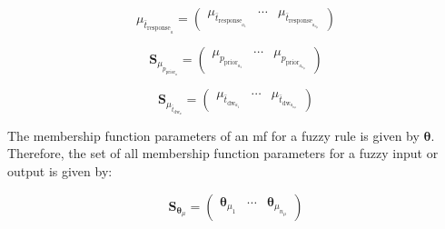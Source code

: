 \documentclass[conference]{IEEEtran}
\begin{document}
\begin{equation} \label{eq:S_mu_t_response}
    {\mu_{\bar{t}_{\text{response}_{a}}}} = 
    \begin{pmatrix}
        \mu_{\bar{t}_{\text{response}_{a_{1}}}} & \cdots & \mu_{\bar{t}_{\text{response}_{a_{n_{\mu}}}}}
    \end{pmatrix}
\end{equation}

\begin{equation} \label{eq:S_mu_p_prior}
    \bm{S}_{\mu_{p_{\text{prior}_{a}}}} = 
    \begin{pmatrix}
        \mu_{p_{\text{prior}_{a_{1}}}} & \cdots & \mu_{p_{\text{prior}_{a_{n_{\mu}}}}}
    \end{pmatrix}
\end{equation}
 
\begin{equation} \label{eq:S_mu_t_dw}
    \bm{S}_{\mu_{\bar{t}_{\text{dw}_{a}}}} = 
    \begin{pmatrix}
        \mu_{\bar{t}_{\text{dw}_{a_{1}}}} & \cdots & \mu_{\bar{t}_{\text{dw}_{a_{n_{\mu}}}}}
    \end{pmatrix}
\end{equation}

The membership function parameters of an \gls{mf} for a fuzzy rule is given by $\bm{\theta}$.
Therefore, the set of all membership function parameters for a fuzzy input or output is given by:

\begin{equation} \label{eq:S_theta_mu}
    \bm{S}_{\bm{\theta}_{\mu}} = 
    \begin{pmatrix}
        \bm{\theta}_{\mu_{1}} & \cdots & \bm{\theta}_{\mu_{n_{\mu}}}
    \end{pmatrix}
\end{equation}
\end{document}
